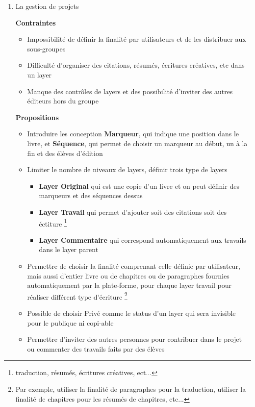 \begin{enumerate}
    \item La gestion de projets

    \textbf{Contraintes}
    \begin{itemize}
        \item Impossibilité de définir la finalité par utilisateurs et de les distribuer aux sous-groupes
        \item Difficulté d'organiser des citations, résumés, écritures créatives, etc dans un layer
        \item Manque des contrôles de layers et des possibilité d'inviter des autres éditeurs hors du groupe
    \end{itemize}
    \textbf{Propositions} 
    \begin{itemize}
        \item Introduire les conception \textbf{Marqueur}, qui indique une position dans le livre, et \textbf{Séquence}, qui permet de choisir un marqueur au début, un à la fin et des élèves d'édition
        \item Limiter le nombre de niveaux de layers, définir trois type de layers 
            \begin{itemize}
                \item \textbf{Layer Original } qui est une copie d'un livre et on peut définir des marqueurs et des séquences dessus
                \item \textbf{Layer Travail } qui permet d'ajouter soit des citations soit des éctiture \footnote{ traduction, résumés, écritures créatives, ect... } 
                \item \textbf{Layer Commentaire } qui correspond automatiquement aux travails dans le layer parent
            \end{itemize}
        \item Permettre de choisir la finalité comprenant celle définie par utilisateur, mais aussi d'entier livre ou de chapitres ou de paragraphes fournies automatiquement par la plate-forme, pour chaque layer travail pour réaliser différent type d'écriture \footnote{ Par exemple, utiliser la finalité de paragraphes pour la traduction, utiliser la finalité de chapitres pour les résumés de chapitres, etc...} 
        \item Possible de choisir Privé comme le status d'un layer qui sera invisible pour le publique ni copi-able
        \item Permettre d'inviter des autres personnes pour contribuer dans le projet ou commenter des travails faits par des élèves
    \end{itemize}


\end{enumerate}

